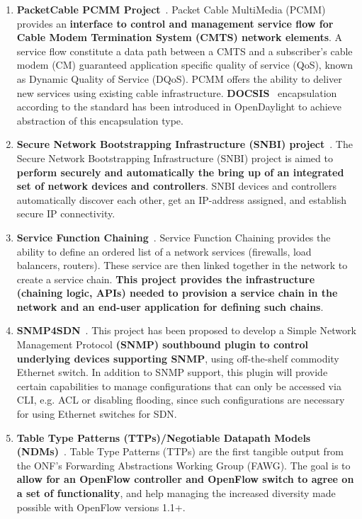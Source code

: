 \documentclass[a4paper, 12pt]{book}
\begin{document}
\begin{enumerate}
\item{\textbf{PacketCable PCMM Project}}~\cite{OpenDaylightWikiPacketCable}. Packet Cable MultiMedia (PCMM)~\cite{PCMM} provides an \textbf{interface to control and management service flow for Cable Modem Termination System (CMTS) network elements}. A service flow constitute a data path between a CMTS and a subscriber's cable modem (CM) guaranteed application specific quality of service (QoS), known as Dynamic Quality of Service (DQoS). PCMM offers the ability to deliver new services using existing cable infrastructure. \textbf{DOCSIS}~\cite{DOCSIS} encapsulation according to the standard has been introduced in OpenDaylight to achieve abstraction of this encapsulation type.
\item{\textbf{Secure Network Bootstrapping Infrastructure (SNBI) project}}~\cite{OpenDaylightWikiSNBI}.  The Secure Network Bootstrapping Infrastructure (SNBI) project is aimed to \textbf{perform securely and automatically the bring up of an integrated set of network devices and controllers}. SNBI devices and controllers automatically discover each other, get an IP-address assigned, and establish secure IP connectivity.
\item{\textbf{Service Function Chaining}}~\cite{OpenDaylightWikiSNMP}. Service Function Chaining provides the ability to define an ordered list of a network services (firewalls, load balancers, routers). These service are then linked together in the network to create a service chain. \textbf{This project provides the infrastructure (chaining logic, APIs) needed to provision a service chain in the network and an end-user application for defining such chains}.
\item{\textbf{SNMP4SDN}}~\cite{OpenDaylightWikiTTP}. This project has been proposed to develop a Simple Network Management Protocol \textbf{(SNMP) southbound plugin to control underlying devices supporting SNMP}, using off-the-shelf commodity Ethernet switch. In addition to SNMP support, this plugin will provide certain capabilities to manage configurations that can only be accessed via CLI, e.g. ACL or disabling flooding, since such configurations are necessary for using Ethernet switches for SDN.
\item{\textbf{Table Type Patterns (TTPs)/Negotiable Datapath Models (NDMs)}}~\cite{OpenDaylightWiki}. Table Type Patterns (TTPs) are the first tangible output from the ONF's Forwarding Abstractions Working Group (FAWG). The goal is to \textbf{allow for an OpenFlow controller and OpenFlow switch to agree on a set of functionality}, and help managing the increased diversity made possible with OpenFlow versions 1.1+.

\end{enumerate}
\end{document}
